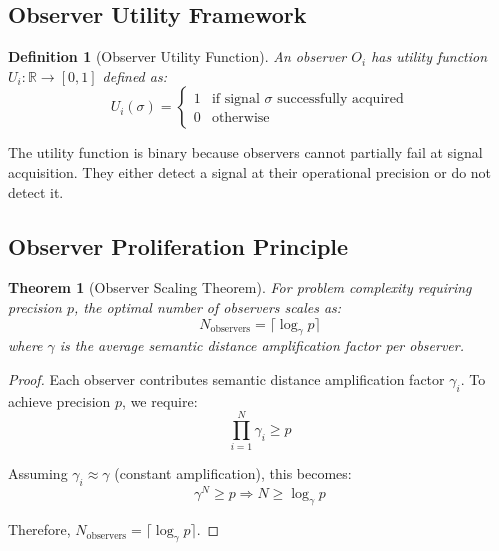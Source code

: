 \documentclass[12pt,a4paper]{article}
\newtheorem{theorem}{Theorem}
\newtheorem{definition}{Definition}
\begin{document}
\subsection{Observer Utility Framework}

\begin{definition}[Observer Utility Function]
An observer $O_i$ has utility function $U_i: \mathbb{R} \to [0,1]$ defined as:
\begin{equation}
U_i(\sigma) = \begin{cases}
1 & \text{if signal } \sigma \text{ successfully acquired} \\
0 & \text{otherwise}
\end{cases}
\end{equation}
\end{definition}

The utility function is binary because observers cannot partially fail at signal acquisition. They either detect a signal at their operational precision or do not detect it.

\subsection{Observer Proliferation Principle}

\begin{theorem}[Observer Scaling Theorem]
For problem complexity requiring precision $p$, the optimal number of observers scales as:
\begin{equation}
N_{\text{observers}} = \lceil \log_{\gamma} p \rceil
\end{equation}
where $\gamma$ is the average semantic distance amplification factor per observer.
\end{theorem}

\begin{proof}
Each observer contributes semantic distance amplification factor $\gamma_i$. To achieve precision $p$, we require:
\begin{equation}
\prod_{i=1}^{N} \gamma_i \geq p
\end{equation}

Assuming $\gamma_i \approx \gamma$ (constant amplification), this becomes:
\begin{equation}
\gamma^N \geq p \Rightarrow N \geq \log_{\gamma} p
\end{equation}

Therefore, $N_{\text{observers}} = \lceil \log_{\gamma} p \rceil$.
\end{proof}
\end{document}
